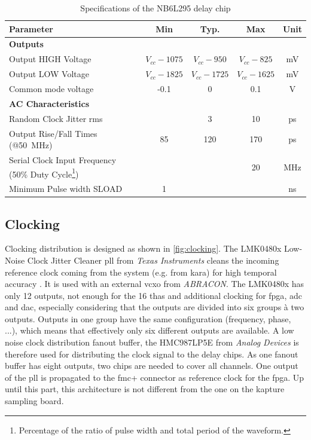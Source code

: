 \begin{table}[tbh]
	\caption[NB6L295 Characteristics]{Specifications of the NB6L295 delay chip \cite{NB6L295}}
	\label{tab:nb6l295}
	\begin{minipage}{\textwidth}
		\centering
		\begin{tabularx}{\textwidth}{Xcccc}
			\toprule
			\textbf{Parameter} & \textbf{Min} & \textbf{Typ.} & \textbf{Max} & \textbf{Unit}\\
			\midrule
			\textbf{Outputs} &&&& \\
			Output HIGH Voltage & $V_{cc} - 1075$ & $V_{cc} - 950$ & $V_{cc} - 825$ & mV\\
			Output LOW Voltage & $V_{cc} - 1825$ & $V_{cc} - 1725$ & $V_{cc} - 1625$ & mV\\
			Common mode voltage & -0.1 & 0 & 0.1 & V\\[0.3cm]
			\textbf{AC Characteristics} &&&&\\
			Random Clock Jitter \gls{rms}&  & 3 & 10 & ps\\
			Output Rise/Fall Times (@\SI{50}{\mega \hertz}) & 85 & 120 & 170 & ps\\
			Serial Clock Input Frequency (50\% Duty Cycle\footnote{Percentage of the ratio of pulse width and total period of the waveform.}) &  &  & 20 & MHz\\
			Minimum Pulse width SLOAD  & 1 &  &  & ns\\
			\bottomrule
		\end{tabularx}
	\end{minipage}
\end{table}


\subsection{Clocking}
Clocking distribution is designed as shown in \autoref{fig:clocking}. The LMK0480x Low-Noise Clock Jitter Cleaner \gls{pll} from \textit{Texas Instruments} cleans the incoming reference clock coming from the system (e.g. from \gls{kara}) for high temporal accuracy \cite{caselle2013}. It is used with an external \gls{vcxo} from \textit{ABRACON}. The LMK0480x has only 12 outputs, not enough for the 16 \glspl{tha} and additional clocking for \gls{fpga}, \gls{adc} and \gls{dac}, especially considering that the outputs are divided into six groups à two outputs. Outputs in one group have the same configuration (frequency, phase, ...), which means that effectively only six different outputs are available. A low noise clock distribution fanout buffer, the HMC987LP5E from \textit{Analog Devices} is therefore used for distributing the clock signal to the delay chips. As one fanout buffer has eight outputs, two chips are needed to cover all channels. One output of the \gls{pll} is propagated to the \gls{fmc}+ connector as reference clock for the \gls{fpga}. Up until this part, this architecture is not different from the one on the \gls{kapture} sampling board. 

